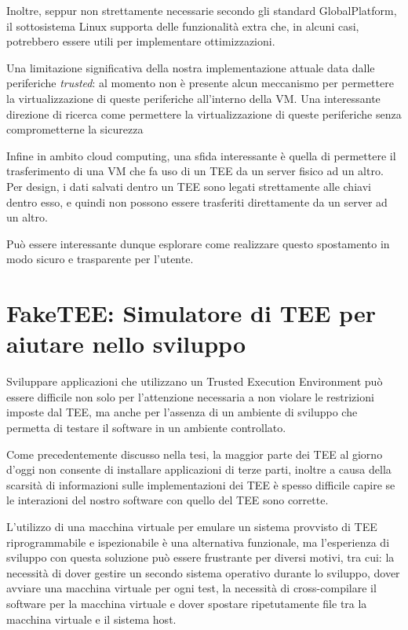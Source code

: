 \documentclass[12pt,italian]{report}
\begin{document}
Inoltre, seppur non strettamente necessarie secondo gli standard GlobalPlatform,
il sottosistema Linux supporta delle funzionalità extra che, in alcuni casi,
potrebbero essere utili per implementare ottimizzazioni.

\bigbreak \noindent

Una limitazione significativa della nostra implementazione attuale data dalle
periferiche \textit{trusted}: al momento non è presente alcun meccanismo per
permettere la virtualizzazione di queste periferiche all'interno della VM.
Una interessante direzione di ricerca come permettere la virtualizzazione
di queste periferiche senza comprometterne la sicurezza

\bigbreak \noindent

Infine in ambito cloud computing, una sfida interessante è quella di permettere
il trasferimento di una VM che fa uso di un TEE da un server fisico ad un altro.
Per design, i dati salvati dentro un TEE sono legati strettamente alle chiavi
dentro esso, e quindi non possono essere trasferiti direttamente da un
server ad un altro.

Può essere interessante dunque esplorare come realizzare questo spostamento
in modo sicuro e trasparente per l'utente.

\appendix
\chapter{FakeTEE: Simulatore di TEE per aiutare nello sviluppo}
\label{app:faketee}
Sviluppare applicazioni che utilizzano un Trusted Execution Environment può
essere difficile non solo per l'attenzione necessaria a non violare
le restrizioni imposte dal TEE, ma anche per l'assenza di un ambiente di
sviluppo che permetta di testare il software in un ambiente controllato.

Come precedentemente discusso nella tesi, la maggior parte dei TEE al giorno
d'oggi non consente di installare applicazioni di terze parti, inoltre
a causa della scarsità di informazioni sulle implementazioni dei TEE
è spesso difficile capire se le interazioni del nostro software con quello
del TEE sono corrette.

L'utilizzo di una macchina virtuale per emulare un sistema provvisto di TEE
riprogrammabile e ispezionabile è una alternativa funzionale, ma
l'esperienza di sviluppo con questa soluzione può essere frustrante per
diversi motivi, tra cui: la necessità di dover gestire un secondo sistema
operativo durante lo sviluppo, dover avviare una macchina virtuale per ogni
test, la necessità di cross-compilare il software per la macchina virtuale
e dover spostare ripetutamente file tra la macchina virtuale e il sistema
host.
\end{document}
